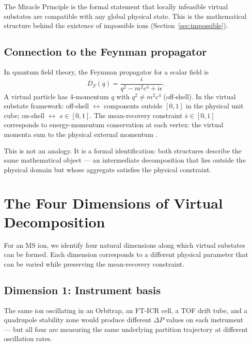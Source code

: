 \documentclass[twocolumn,10pt,a4paper]{article}
\theoremstyle{thmstyle}
\theoremstyle{definition}
\theoremstyle{remark}
\newcommand{\dP}{\Delta P}
\begin{document}
The Miracle Principle is the formal statement that locally infeasible
virtual substates are compatible with any global physical state. This
is the mathematical structure behind the existence of impossible ions
(Section~\ref{sec:impossible}).

\subsection{Connection to the Feynman propagator}

In quantum field theory, the Feynman propagator for a scalar field is
\begin{equation}
D_F(q) = \frac{i}{q^2 - m^2c^4 + i\epsilon}.
\label{eq:propagator}
\end{equation}
A virtual particle has 4-momentum $q$ with $q^2 \neq m^2c^4$ (off-shell).
In the virtual substate framework: off-shell $\leftrightarrow$ components
outside $[0,1]$ in the physical unit cube; on-shell $\leftrightarrow$
$s \in [0,1]$. The mean-recovery constraint $\bar{s} \in [0,1]$
corresponds to energy-momentum conservation at each vertex: the virtual
momenta sum to the physical external momentum \citep{peskin1995}.

This is not an analogy. It is a formal identification: both structures
describe the same mathematical object --- an intermediate decomposition
that lies outside the physical domain but whose aggregate satisfies the
physical constraint.

\section{The Four Dimensions of Virtual Decomposition}
\label{sec:stacking}

For an MS ion, we identify four natural dimensions along which virtual
substates can be formed. Each dimension corresponds to a different
physical parameter that can be varied while preserving the mean-recovery
constraint.

\subsection{Dimension 1: Instrument basis}

The same ion oscillating in an Orbitrap, an FT-ICR cell, a TOF drift
tube, and a quadrupole stability zone would produce different $\dP$
values on each instrument --- but all four are measuring the same
underlying partition trajectory at different oscillation rates.
\end{document}
